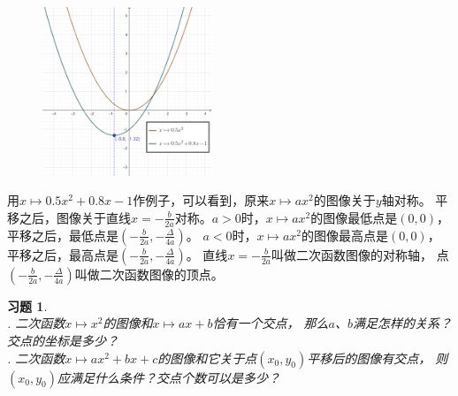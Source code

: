 \documentclass[12pt,UTF8]{ctexbook}
\newtheorem{xt}{习题}[section]
\begin{document}
\begin{figure}[ht] %
    \centering
    \includegraphics[width=0.45\textwidth]{二次函数3.png}
\end{figure}

用$x\mapsto 0.5x^2+0.8x-1$作例子，可以看到，原来$x\mapsto ax^2$的图像关于$y$轴对称。
平移之后，图像关于直线$x = -\frac{b}{2a}$对称。$a>0$时，$x\mapsto ax^2$的图像最低点是$(0,0)$，
平移之后，最低点是$\left(-\frac{b}{2a}, -\frac{\Delta}{4a}\right)$。
$a<0$时，$x\mapsto ax^2$的图像最高点是$(0,0)$，
平移之后，最高点是$\left(-\frac{b}{2a}, -\frac{\Delta}{4a}\right)$。
直线$x = -\frac{b}{2a}$叫做二次函数图像的对称轴，
点$\left(-\frac{b}{2a}, -\frac{\Delta}{4a}\right)$叫做二次函数图像的顶点。
\begin{xt}\label{xt:5-1-0}
    \mbox{} \\    
    . 二次函数$x\mapsto x^2$的图像和$x\mapsto ax + b$恰有一个交点，
    那么$a$、$b$满足怎样的关系？交点的坐标是多少？\\
    . 二次函数$x\mapsto ax^2+bx+c$的图像和它关于点$(x_0, y_0)$平移后的图像有交点，
    则$(x_0, y_0)$应满足什么条件？交点个数可以是多少？
\end{xt}

\end{document}
